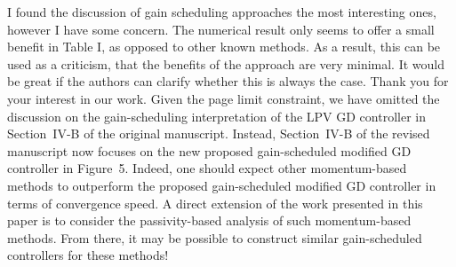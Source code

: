 \begin{rebuttal}[pending]
    {%
        I found the discussion of gain scheduling approaches the most interesting ones, however I have some concern. The numerical result only seems to offer a small benefit in Table I, as opposed to other known methods. As a result, this can be used as a criticism, that the benefits of the approach are very minimal. It would be great if the authors can clarify whether this is always the case.
    }%
    {%
        Thank you for your interest in our work. Given the page limit constraint, we have omitted the discussion on the gain-scheduling interpretation of the LPV GD controller in \mbox{Section~IV-B} of the original manuscript. Instead, Section~IV-B of the revised manuscript now focuses on the new proposed gain-scheduled modified GD controller in Figure~5. Indeed, one should expect other momentum-based methods to outperform the proposed gain-scheduled modified GD controller in terms of convergence speed. A direct extension of the work presented in this paper is to consider the passivity-based analysis of such momentum-based methods. From there, it may be possible to construct similar gain-scheduled controllers for these methods!
    }%
\end{rebuttal}
